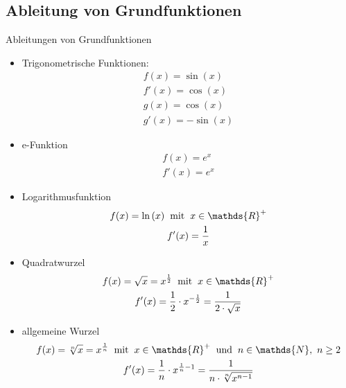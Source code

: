 \subsection{Ableitung von Grundfunktionen}
\begin{merke}{Ableitungen von Grundfunktionen}{}
\begin{itemize}
 \item Trigonometrische Funktionen:
    \begin{gather*} 
	f(x) = \sin({x})  \\
	f'(x) = \cos({x})\\
 g(x) = \cos{(x)}\\
 g'(x) = -\sin{(x)}	\end{gather*}
\item e-Funktion
\begin{gather*} 
	f(x) = e^x  \\
	f'(x) = e^x
	\end{gather*}
 \item Logarithmusfunktion
 \begin{gather*} 
	f(x) = \ln{(x)}   \hspace{0.2cm} \text{mit} \hspace{0.2cm} x\in \mathds{R}^+\\
	f'(x) = \dfrac{1}{x}
	\end{gather*}
 \item Quadratwurzel
 \begin{gather*} 
	f(x) = \sqrt{x} = x^{\frac{1}{2}}   \hspace{0.2cm} \text{mit} \hspace{0.2cm} x\in \mathds{R}^+ \\
 f'(x) = \dfrac{1}{2} \cdot x^{-\frac{1}{2} }= \dfrac{1}{2\cdot \sqrt{x}} 
 \end{gather*}
  \item allgemeine Wurzel
 \begin{gather*} 
	f(x) = \sqrt[n]{x} = x^{\frac{1}{n}}   \hspace{0.2cm} \text{mit} \hspace{0.2cm} x\in \mathds{R}^+  \hspace{0.2cm} \text{und} \hspace{0.2cm} n\in \mathds{N},\ n\geq 2 \\
 f'(x) = \dfrac{1}{n} \cdot x^{ \frac{1}{n} - 1}= \dfrac{1}{n\cdot \sqrt[n]{x^{n-1}}} 
 \end{gather*}
\end{itemize}
\end{merke}
